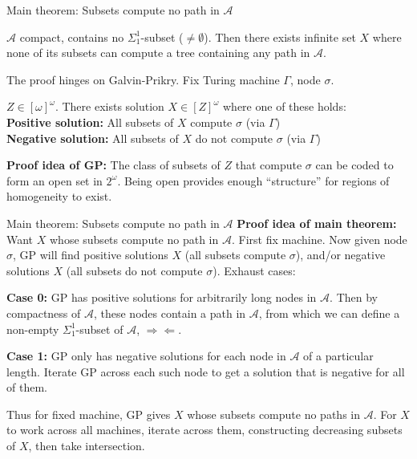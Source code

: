 \begin{frame}{Main theorem: Subsets compute no path in $\mathcal{A}$}
  \begin{main-thm*}
    $\mathcal{A}$ compact, contains no $\Sigma_1^1$-subset
    ($\neq\emptyset$). Then there exists infinite set $X$ where none of
    its subsets can compute a tree containing any path in $\mathcal{A}$.
  \end{main-thm*}

  The proof hinges on Galvin-Prikry. Fix Turing machine $\Gamma$, node
  $\sigma$.
  \begin{fact}
    $Z\in[\omega]^\omega$. There exists solution $X\in[Z]^\omega$
    where one of these holds:\\
    \textbf{Positive solution:} All subsets of $X$ compute $\sigma$
    (via $\Gamma$)\\
    \textbf{Negative solution:} All subsets of $X$ do not compute $\sigma$
    (via $\Gamma$)
  \end{fact}
  \textbf{Proof idea of GP:} The class of subsets of $Z$ that
  compute $\sigma$ can be coded to form an open set in $2^\omega$. Being
  open provides enough ``structure'' for regions of homogeneity to exist.
\end{frame}

\begin{frame}{Main theorem: Subsets compute no path in $\mathcal{A}$}
  \textbf{Proof idea of main theorem:} Want $X$ whose subsets compute no
  path in $\mathcal{A}$. First fix machine. Now given node $\sigma$, GP
  will find positive solutions $X$ (all subsets compute $\sigma$), and/or
  negative solutions $X$ (all subsets do not compute $\sigma$). Exhaust
  cases:

  \vspace{1em}
  \textbf{Case 0:} GP has positive solutions for arbitrarily long nodes in
  $\mathcal{A}$. Then by compactness of $\mathcal{A}$, these nodes contain
  a path in $\mathcal{A}$, from which we can define a non-empty
  $\Sigma_1^1$-subset of $\mathcal{A}$, $\Rightarrow\Leftarrow$.

  \vspace{0.5em}
  \textbf{Case 1:} GP only has negative solutions for each node in
  $\mathcal{A}$ of a particular length. Iterate GP across each such node to
  get a solution that is negative for all of them.

  \vspace{1em}
  Thus for fixed machine, GP gives $X$ whose subsets compute no paths in
  $\mathcal{A}$. For $X$ to work across all machines, iterate across them,
  constructing decreasing subsets of $X$, then take intersection.
\end{frame}

